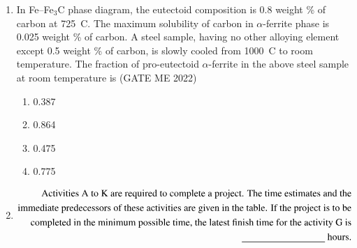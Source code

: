 \documentclass[journal]{IEEEtran}
\numberwithin{equation}{enumi}
\numberwithin{figure}{enumi}
\begin{document}
\begin{enumerate}
\begin{multicols}{4}
\begin{enumerate}
        \end{enumerate}
    \end{multicols}
    \item In Fe--Fe$_3$C phase diagram, the eutectoid composition is 0.8 weight \% of carbon at 725~\textdegree C. The maximum solubility of carbon in $\alpha$-ferrite phase is 0.025 weight \% of carbon. A steel sample, having no other alloying element except 0.5 weight \% of carbon, is slowly cooled from 1000~\textdegree C to room temperature. The fraction of pro-eutectoid $\alpha$-ferrite in the above steel sample at room temperature is
\hfill{(GATE ME 2022)}
    \begin{multicols}{4}
    \begin{enumerate}
    \item 0.387
    \item 0.864
    \item 0.475
    \item 0.775
\end{enumerate}
    \end{multicols}
 \item \begin{align*}
\text{Activities A to K are required to complete a project. The time estimates and the} \\
\text{immediate predecessors of these activities are given in the table. If the project is to be} \\
\text{completed in the minimum possible time, the latest finish time for the activity G is} \\
\text{\underline{\hspace{3cm}} hours.}
\end{align*}


\end{enumerate}
\end{document}
